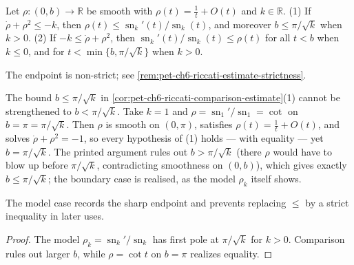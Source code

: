 \begin{corollary}
  \label{cor:pet-ch6-riccati-comparison-estimate}
  \leanok
  Let $\rho:(0,b)\to\mathbb{R}$ be smooth with $\rho(t)=\tfrac1t+O(t)$ and $k\in\mathbb{R}$.
  (1) If $\dot\rho+\rho^2\le-k$, then $\rho(t)\le\operatorname{sn}_k'(t)/\operatorname{sn}_k(t)$, and
  moreover $b\le\pi/\sqrt k$ when $k>0$. (2) If $-k\le\dot\rho+\rho^2$, then
  $\operatorname{sn}_k'(t)/\operatorname{sn}_k(t)\le\rho(t)$ for all $t<b$ when $k\le0$, and for
  $t<\min\{b,\pi/\sqrt k\}$ when $k>0$.

  The endpoint is non-strict; see
  \cref{rem:pet-ch6-riccati-estimate-strictness}.
\end{corollary}

\begin{remark}
  \label{rem:pet-ch6-riccati-estimate-strictness}
  \leanok
  The bound $b\le\pi/\sqrt k$ in \cref{cor:pet-ch6-riccati-comparison-estimate}(1)
  cannot be strengthened to $b<\pi/\sqrt k$. Take $k=1$ and
  $\rho=\operatorname{sn}_1'/\operatorname{sn}_1=\cot$ on $b=\pi=\pi/\sqrt k$. Then $\rho$ is
  smooth on $(0,\pi)$, satisfies $\rho(t)=\tfrac1t+O(t)$, and solves
  $\dot\rho+\rho^2=-1$, so every hypothesis of (1) holds — with equality — yet
  $b=\pi/\sqrt k$. The printed argument rules out $b>\pi/\sqrt k$ (there $\rho$
  would have to blow up before $\pi/\sqrt k$, contradicting smoothness on
  $(0,b)$), which gives exactly $b\le\pi/\sqrt k$; the boundary case is realised,
  as the model $\rho_k$ itself shows.

  The model case records the sharp endpoint and prevents replacing $\le$ by a
  strict inequality in later uses.
\end{remark}
\begin{proof}
  \sketch
  The model \(\rho_k=\operatorname{sn}_k'/\operatorname{sn}_k\) has first pole at \(\pi/\sqrt{k}\) for \(k>0\). Comparison rules out larger \(b\), while \(\rho=\cot t\) on \(b=\pi\) realizes equality.
\end{proof}

